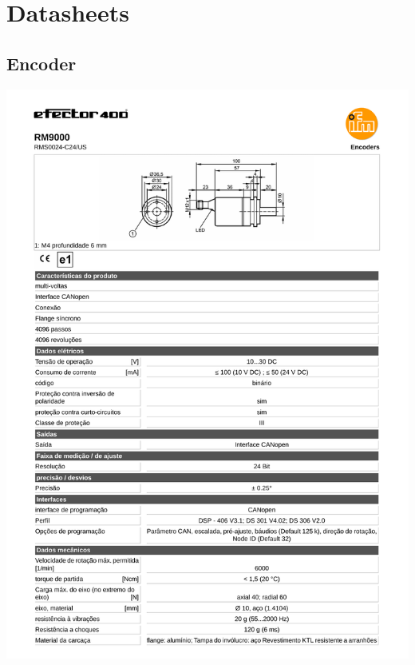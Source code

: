 \section{Datasheets}
 \subsection{Encoder}
 \includegraphics[width=0.9\columnwidth]{figs/datasheets/rm9000.pdf}

